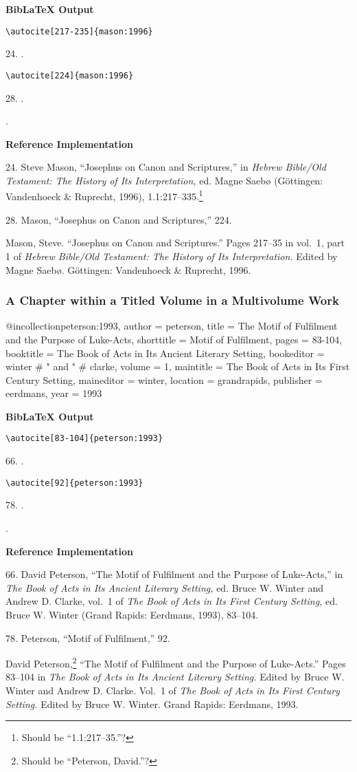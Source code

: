 \documentclass[a4paper]{article}
\newcommand\citetest[5]{%
  {\textbf{BibLaTeX Output}\par
   \nobreak
   \texttt{\textbackslash autocite[#2]\{#5\}}\par
   \color{biblatex-colour}
   #1. \cite[#2]{#5}.\par
   \color{black}
   \texttt{\textbackslash autocite[#4]\{#5\}}\par
   \color{biblatex-colour}
   #3. \cite[#4]{#5}.\par
   \hangindent\bibindent\bibentrycite{#5}.\par}}
\newenvironment{refimp}{%
  \begin{minipage}{\linewidth}
    \setlength{\parskip}{1ex}
    \textbf{Reference Implementation}\par
    \nobreak
    \color{reference-colour}
}{\end{minipage}}
\newenvironment{vb}{%
  \setlength{\parskip}{0pt}
  \verbatim}{\endverbatim}
\begin{document}
\citetest{24}{217-235}{28}{224}{mason:1996}

\begin{refimp}
  24. Steve Mason, “Josephus on Canon and Scriptures,” in \emph{Hebrew
  Bible\slash Old Testament: The History of Its Interpretation,} ed. Magne
  Saebø (Göttingen: Vandenhoeck \& Ruprecht, 1996),
  1.1:217–335.\footnote{Should be “1.1:217–35.”?}

  28. Mason, “Josephus on Canon and Scriptures,” 224.

  \hangindent\bibindent Mason, Steve. “Josephus on Canon and Scriptures.”
  Pages 217–35 in vol.~1, part 1 of \emph{Hebrew Bible\slash Old Testament:
  The History of Its Interpretation.} Edited by Magne Saebø. Göttingen:
  Vandenhoeck \& Ruprecht, 1996.
\end{refimp}

\subsubsection{A Chapter within a Titled Volume in a Multivolume Work}

\begin{vb}
@incollection{peterson:1993,
  author = peterson,
  title = {The Motif of Fulfilment and the Purpose of Luke-Acts},
  shorttitle = {Motif of Fulfilment},
  pages = {83-104},
  booktitle = {The Book of Acts in Its Ancient Literary Setting},
  bookeditor = winter # " and " # clarke,
  volume = {1},
  maintitle = {The Book of Acts in Its First Century Setting},
  maineditor = winter,
  location = grandrapids,
  publisher = eerdmans,
  year = {1993}
}
\end{vb}  

\citetest{66}{83-104}{78}{92}{peterson:1993}

\begin{refimp}
  66. David Peterson, “The Motif of Fulfilment and the Purpose of Luke-Acts,”
  in \emph{The Book of Acts in Its Ancient Literary Setting,} ed. Bruce W.
  Winter and Andrew D. Clarke, vol.~1 of \emph{The Book of Acts in Its First
  Century Setting,} ed. Bruce W. Winter (Grand Rapids: Eerdmans, 1993),
  83–104.

  78. Peterson, “Motif of Fulfilment,” 92.

  \hangindent\bibindent David Peterson,\footnote{Should be “Peterson,
  David.”?} “The Motif of Fulfilment and the Purpose of Luke-Acts.” Pages
  83–104 in \emph{The Book of Acts in Its Ancient Literary Setting.} Edited by
  Bruce W. Winter and Andrew D. Clarke. Vol.~1 of \emph{The Book of Acts in
  Its First Century Setting.} Edited by Bruce W. Winter. Grand Rapids:
  Eerdmans, 1993.
\end{refimp}
\end{document}
